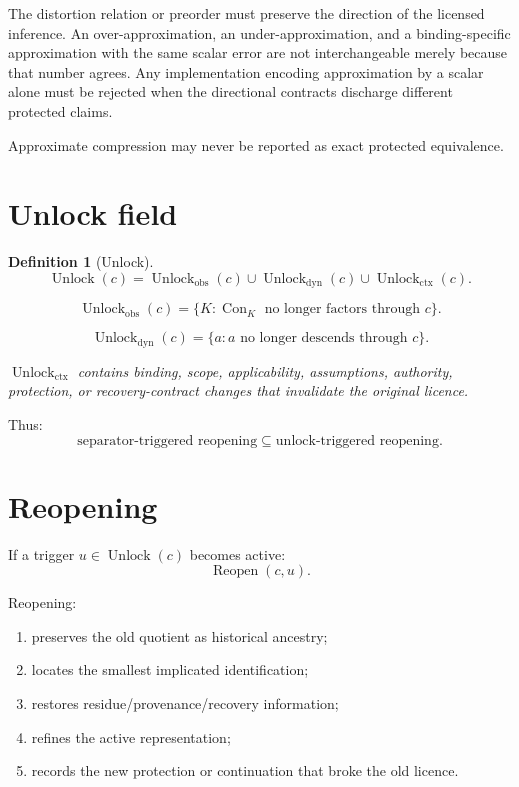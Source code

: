 \documentclass[11pt,oneside]{article}
\newtheorem{definition}{Definition}[section]
\newcommand{\Con}{\operatorname{Con}}
\newcommand{\Unlock}{\operatorname{Unlock}}
\newcommand{\Reopen}{\operatorname{Reopen}}
\begin{document}
The distortion relation or preorder must preserve the direction of the licensed
inference.  An over-approximation, an under-approximation, and a binding-specific
approximation with the same scalar error are not interchangeable merely because that
number agrees.  Any implementation encoding approximation by a scalar alone must be
rejected when the directional contracts discharge different protected claims.

Approximate compression may never be reported as exact protected equivalence.

\section{Unlock field}

\begin{definition}[Unlock]
\[
\boxed{
\Unlock(c)
=
\Unlock_{\mathrm{obs}}(c)
\cup
\Unlock_{\mathrm{dyn}}(c)
\cup
\Unlock_{\mathrm{ctx}}(c).
}
\]

\[
\Unlock_{\mathrm{obs}}(c)
=
\{
K:
\Con_K
\text{ no longer factors through }c
\}.
\]

\[
\Unlock_{\mathrm{dyn}}(c)
=
\{
a:
a
\text{ no longer descends through }c
\}.
\]

\(\Unlock_{\mathrm{ctx}}\) contains binding, scope, applicability, assumptions, authority, protection, or recovery-contract changes that invalidate the original licence.
\end{definition}

Thus:
\[
\boxed{
\text{separator-triggered reopening}
\subseteq
\text{unlock-triggered reopening}.
}
\]

\section{Reopening}

If a trigger \(u\in\Unlock(c)\) becomes active:
\[
\boxed{
\Reopen(c,u).
}
\]

Reopening:
\begin{enumerate}
\item preserves the old quotient as historical ancestry;
\item locates the smallest implicated identification;
\item restores residue/provenance/recovery information;
\item refines the active representation;
\item records the new protection or continuation that broke the old licence.
\end{enumerate}
\end{document}
